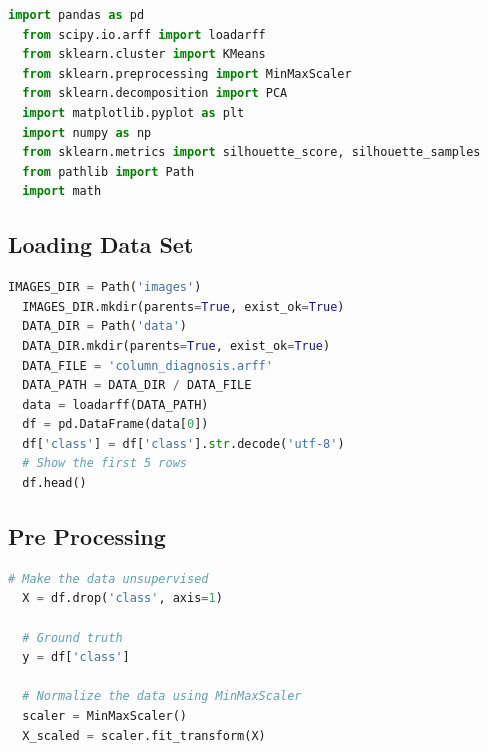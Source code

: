 \documentclass{article}
\begin{document}
\begin{lstlisting}[language=Python]
  import pandas as pd
  from scipy.io.arff import loadarff
  from sklearn.cluster import KMeans
  from sklearn.preprocessing import MinMaxScaler
  from sklearn.decomposition import PCA
  import matplotlib.pyplot as plt
  import numpy as np
  from sklearn.metrics import silhouette_score, silhouette_samples
  from pathlib import Path
  import math
\end{lstlisting}

\subsection*{Loading Data Set}
\begin{lstlisting}[language=Python]
  IMAGES_DIR = Path('images')
  IMAGES_DIR.mkdir(parents=True, exist_ok=True)
  DATA_DIR = Path('data')
  DATA_DIR.mkdir(parents=True, exist_ok=True)
  DATA_FILE = 'column_diagnosis.arff'
  DATA_PATH = DATA_DIR / DATA_FILE
  data = loadarff(DATA_PATH)
  df = pd.DataFrame(data[0])
  df['class'] = df['class'].str.decode('utf-8')
  # Show the first 5 rows
  df.head()
\end{lstlisting}

\subsection*{Pre Processing}
\begin{lstlisting}[language=Python]
  # Make the data unsupervised
  X = df.drop('class', axis=1)
  
  # Ground truth
  y = df['class']
  
  # Normalize the data using MinMaxScaler
  scaler = MinMaxScaler()
  X_scaled = scaler.fit_transform(X)
\end{lstlisting}
\end{document}
